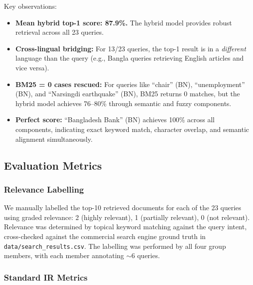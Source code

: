 \documentclass[12pt,a4paper]{article}
\begin{document}
Key observations:
\begin{itemize}
    \item \textbf{Mean hybrid top-1 score: 87.9\%.} The hybrid model provides robust retrieval across all 23 queries.
    \item \textbf{Cross-lingual bridging:} For 13/23 queries, the top-1 result is in a \textit{different} language than the query (e.g., Bangla queries retrieving English articles and vice versa).
    \item \textbf{BM25 = 0 cases rescued:} For queries like ``chair'' (BN), ``unemployment'' (BN), and ``Narsingdi earthquake'' (BN), BM25 returns 0 matches, but the hybrid model achieves 76--80\% through semantic and fuzzy components.
    \item \textbf{Perfect score:} ``Bangladesh Bank'' (BN) achieves 100\% across all components, indicating exact keyword match, character overlap, and semantic alignment simultaneously.
\end{itemize}


\subsection{Evaluation Metrics}

\subsubsection{Relevance Labelling}

We manually labelled the top-10 retrieved documents for each of the 23 queries using graded relevance: 2 (highly relevant), 1 (partially relevant), 0 (not relevant). Relevance was determined by topical keyword matching against the query intent, cross-checked against the commercial search engine ground truth in \texttt{data/search\_results.csv}. The labelling was performed by all four group members, with each member annotating $\sim$6 queries.

\subsubsection{Standard IR Metrics}
\end{document}
